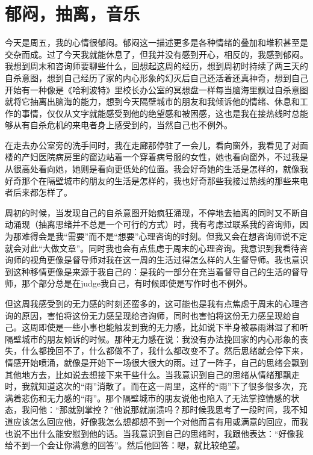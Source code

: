 \chapter{郁闷，抽离，音乐}





今天是周五，我的心情很郁闷。郁闷这一描述更多是各种情绪的叠加和堆积甚至是交杂而成。过了今天我就能休息了，但我并没有感到开心，相反的，我感到郁闷。我想到周末和咨询师要聊些什么，回想起这周的经历，想到周初时持续了两三天的自杀意图，想到自己经历了家的内心形象的幻灭后自己还活着还真神奇，想到自己开始有一种像是《哈利波特》里校长办公室的冥想盘一样每当脑海里飘过自杀意图就将它抽离出脑海的能力，想到今天隔壁城市的朋友和我倾诉他的情绪、休息和工作的事情，仅仅从文字就能感受到他的绝望感和被困感，这也是我在接热线时总能够从有自杀危机的来电者身上感受到的，当然自己也不例外。

在走去办公室旁的洗手间时，我在走廊那停驻了一会儿，看向窗外，我看见了对面楼的产妇医院病房里的窗边站着一个穿着病号服的女性，她也看向窗外，不过我是从很高处看向她，她则是看向更低处的位置。我会好奇她的生活是怎样的，就像我好奇那个在隔壁城市的朋友的生活是怎样的，我也好奇那些我接过热线的那些来电者后来都怎样了。

周初的时候，当发现自己的自杀意图开始疯狂涌现，不停地去抽离的同时又不断自动涌现（抽离思绪并不总是一个可行的方式）时，我有考虑过联系我的咨询师，因为那难得会是我“需要”而不是“想要”心理咨询的时刻。但我又会在想咨询师说不定就会对此“大做文章”。同时我也会有点焦虑于周末的心理咨询。我意识到我看待咨询师的视角更像是督导师\pozhehao{}对我在这一周的生活过得怎么样的人生督导师。我也意识到这种移情更像是来源于我自己的：是我的一部分在充当着督导自己的生活的督导师，那个部分总是在judge我自己，有时候即使是写作时也不例外。

但这周我感受到的无力感的时刻还蛮多的，这可能也是我有点焦虑于周末的心理咨询的原因，害怕将这份无力感呈现给咨询师，同时也害怕将这份无力感呈现给自己。这周即使是一些小事也能触发到我的无力感，比如说下半身被暴雨淋湿了和听隔壁城市的朋友倾诉的时候。那种无力感在说：我没有办法挽回家的内心形象的丧失，什么都挽回不了，什么都做不了，我什么都改变不了。然后思绪就会停下来，情感开始喷涌，就像是开始下一场很大很大的雨。过了一阵子，自己的思绪会飘到其他地方去，比如说去想接下来干些什么。当我意识到自己的思绪从情绪那飘走时，我就知道这次的“雨”消散了。而在这一周里，这样的“雨”下了很多很多次，充满着悲伤和无力感的“雨”。那个隔壁城市的朋友说他也陷入了无法掌控情感的状态，我问他：“那就别掌控？”他说那就崩溃吗？那时候我思考了一段时间，我不知道应该怎么回应他，好像我怎么想都想不到一个对他而言有用或满意的回应，而我也说不出什么能安慰到他的话。当我意识到自己的思绪时，我跟他表达：“好像我给不到一个会让你满意的回答”。然后他回答：嗯，就比较绝望。

